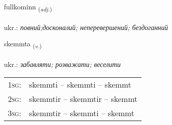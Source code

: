 \documentclass[frontgrid, backgrid]{flacards}\usepackage[]{graphicx}\usepackage[]{xcolor}
\begin{document}
\renewcommand{\blhead}{\vskip5pt {\small\bfseries\footnotesize Lýsingarorð | прикметник }}
\renewcommand{\bcfoot}{\vskip5pt \hspace{2pt}{\small\bfseries\footnotesize 2K}}


{fullkominn \small{\textsubscript{(\textit{adj.})}} \\[1ex] %
 \\
ukr.: \emph{повний;досконалий; неперевершений; бездоганний} \\  [2ex]
\renewcommand*{\arraystretch}{0.8}
}

\renewcommand{\flhead}{\vskip5pt \fboxsep=0pt {\small\bfseries\footnotesize Sagnorð | дієслово}}
\renewcommand{\fcfoot}{\vskip5pt \fboxsep=0pt \hspace{2pt}{\small\bfseries\footnotesize 2K}}

\renewcommand{\blhead}{\vskip5pt {\small\bfseries\footnotesize Sagnorð | дієслово }}
\renewcommand{\bcfoot}{\vskip5pt \hspace{2pt}{\small\bfseries\footnotesize 2K}}


{skemmta \small{\textsubscript{(\textit{v.})}} \\[1ex] %
\textphonetic{[scɛm̥ta]} \\
ukr.: \emph{забавляти; розважати; веселити} \\  [2ex]
\renewcommand*{\arraystretch}{0.8}
\begin{tabular}{p{1cm}l}
\textsc{1sg}: & skemmti -- skemmti -- skemmt \\ 
\textsc{2sg}: & skemmtir -- skemmtir -- skemmt \\ 
\textsc{3sg}: & skemmtir -- skemmti -- skemmt \\ 
\end{tabular}
}
\end{document}
